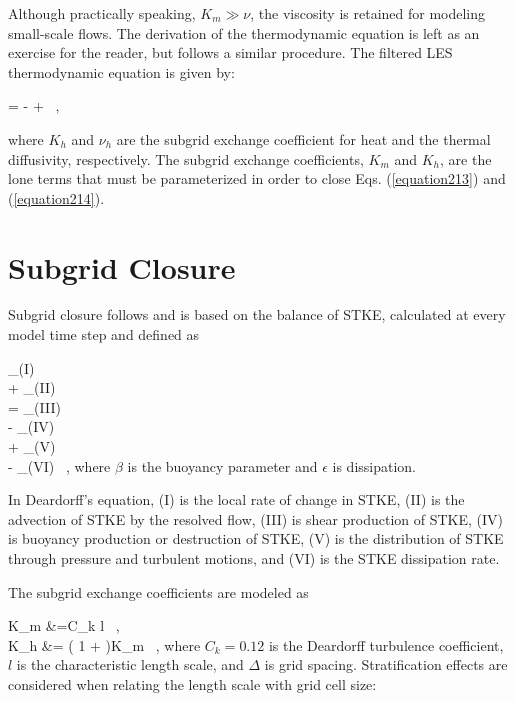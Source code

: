 \noindent Although practically speaking, $K_m \gg \nu$, the viscosity is retained for modeling small-scale flows. The derivation of the thermodynamic equation is left as an exercise for the reader, but follows a similar procedure. The filtered LES thermodynamic equation is given by:


\be
{} = -  +   \, ,
\label{equation214}
\ee


\noindent where $K_h$ and $\nu_h$ are the subgrid exchange coefficient for heat and the thermal diffusivity, respectively. The subgrid exchange coefficients, $K_m$ and $K_h$, are the lone terms that must be parameterized in order to close Eqs. (\autoref{equation213}) and (\autoref{equation214}).

\section{Subgrid Closure}
\label{sg-close-22}

Subgrid closure follows  \citet{Deardorff1980} and is based on the balance of STKE, calculated at every model time step and defined as

  
\be
{}_{(I)}\\
+ _{(II)}\\
= _{(III)} \\
- _{(IV)} \\
+ _{(V)}\\
- _{(VI)} \mbox{ ,}
\label{equation215}
\ee
\noindent
 where $\beta$ is the buoyancy parameter and $\epsilon$ is dissipation.

In Deardorff's equation, (I) is the local rate of change in STKE, (II) is the advection of STKE by the resolved flow, (III) is shear production of STKE, (IV) is buoyancy production or destruction of STKE, (V) is the distribution of STKE through pressure and turbulent motions, and (VI) is the STKE dissipation rate.

The subgrid exchange coefficients are modeled as 


\bse \label{equation216}
\bal
K_m &=C_k l  \mbox{ ,} \\
K_h &= \left( 1 +  \right)K_m \mbox{ ,}
\eal
\ese
\noindent
 where $C_k = 0.12$ is the Deardorff turbulence coefficient, $l$ is the characteristic length scale, and $\Delta$ is grid spacing. Stratification effects are considered when relating the length scale with grid cell size:


